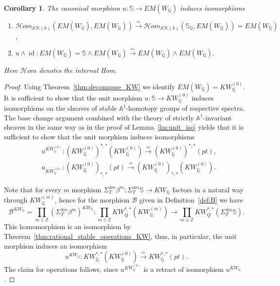 \documentclass[a4paper,12pt,draft]{amsart}
\newtheorem{corollary}{Corollary}
\theoremstyle{definition}
\theoremstyle{remark}
\begin{document}
\begin{corollary} \label{cor:no_extensions}
The canonical morphism $u\colon \mathbb{S}\to EM(W_{{\mathbb Q}})$ induces isomorphisms
\begin{enumerate}
\item
$\mathcal{H}om_{{\mathcal{SH}}(k)}(EM(W_{{\mathbb Q}}), EM(W_{{\mathbb Q}}))\xrightarrow{\simeq} \mathcal{H}om_{{\mathcal{SH}}(k)}(\mathbb{S}_{{\mathbb Q}}, EM(W_{{\mathbb Q}}))=EM(W_{{\mathbb Q}})$,
\item
$u\wedge {\operatorname{id}} \colon EM(W_{{\mathbb Q}})=\mathbb{S}\wedge EM(W_{{\mathbb Q}})\xrightarrow{\simeq} EM(W_{{\mathbb Q}})\wedge EM(W_{{\mathbb Q}})$.
\end{enumerate}
Here $\mathcal{H}om$ denotes the internal Hom.
\end{corollary}
\begin{proof}
Using Theorem~\ref{thm:decompose_KW} we identify $EM(W_{{\mathbb Q}})=KW^{(0)}_{{\mathbb Q}}$. It is sufficient to show that the unit morphism $u\colon \mathbb{S}\to KW^{(0)}_{{\mathbb Q}}$ induces isomorphisms on the sheaves of stable ${{\mathbb A}}^1$-homotopy groups of respective spectra. The base change argument combined with the theory of strictly ${{\mathbb A}}^1$-invariant sheaves in the same way as in the proof of Lemma~\ref{lm:unit_iso} yields that it is sufficient to show that the unit morphism induces isomorphisms
\begin{align*}
&u^{KW^{(0)}_{{\mathbb Q}}}\colon (KW^{(0)}_{{\mathbb Q}})^{*,*}(KW^{(0)}_{{\mathbb Q}})\xrightarrow{\simeq} (KW^{(0)}_{{\mathbb Q}})^{*,*}(pt),\\
&u_{KW^{(0)}_{{\mathbb Q}}}\colon  (KW^{(0)}_{{\mathbb Q}})_{*,*}(pt)\xrightarrow{\simeq} (KW^{(0)}_{{\mathbb Q}})_{*,*}(KW^{(0)}_{{\mathbb Q}}).
\end{align*}

Note that for every $m$ morphism $ \Sigma^{4m}_T \beta^m\colon \Sigma^{4m}_T \mathbb{S}\to KW_{{\mathbb Q}}$ factors in a natural way through $KW^{(m)}_{{\mathbb Q}}$, hence for the morphism $\mathcal{B}$ given in Definition~\ref{def:B} we have
\[
\mathcal{B}^{KW_{{\mathbb Q}}}=\prod_{m\in {{\mathbb Z}}}  (\Sigma^{4m}_T\beta^m)^{KW_{{\mathbb Q}}} \colon \prod_{m\in {{\mathbb Z}}} KW^{*,*}_Q(KW^{(m)}_{{\mathbb Q}}) \to \prod_{m\in {{\mathbb Z}}} KW^{*,*}_Q(\Sigma^{4m}_T \mathbb{S} ).
\]
This homomorphism is an isomorphism by Theorem~\ref{thm:rational_stable_operations_KW}, thus, in particular, the unit morphism induces an isomorphism 
\[
u^{KW_{{\mathbb Q}}}\colon KW_{{\mathbb Q}}^{*,*}(KW^{(0)}_{{\mathbb Q}})\xrightarrow{\simeq} KW_{{\mathbb Q}}^{*,*}(pt).
\]
The claim for operations follows, since $u^{KW^{(0)}_{{\mathbb Q}}}$ is a retract of isomorphism $u^{KW_{{\mathbb Q}}}$.


\end{proof}
\end{document}
